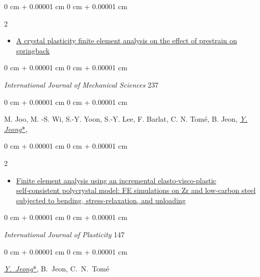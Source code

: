 \documentclass[10pt, letterpaper]{article}
\newenvironment{highlights}{
    \begin{itemize}[
        topsep=0.10 cm,
        parsep=0.10 cm,
        partopsep=0pt,
        itemsep=0pt,
        leftmargin=0 cm + 10pt
    ]
}{
    \end{itemize}
} %
\newenvironment{onecolentry}{
    \begin{adjustwidth}{
        0 cm + 0.00001 cm
    }{
        0 cm + 0.00001 cm
    }
}{
    \end{adjustwidth}
} %
\newenvironment{twocolentry}[2][]{
    \onecolentry
    \def\secondColumn{#2}
    \setcolumnwidth{\fill, 4.5 cm}
    \begin{paracol}{2}
}{
    \switchcolumn \raggedleft \secondColumn
    \end{paracol}
    \endonecolentry
} %
\begin{document}
\begin{samepage}
            \begin{twocolentry}{2023}
                \begin{highlights}
                \item\href{https://doi.org/10.1016/j.ijmecsci.2022.107796}{A crystal plasticity finite element analysis on the effect of prestrain on springback}
                \end{highlights}
            \end{twocolentry}
            \begin{onecolentry}
                {\it International Journal of Mechanical Sciences} 237
              \end{onecolentry}
            \begin{onecolentry}
                M. Joo, M. -S. Wi, S.-Y. Yoon, S.-Y. Lee, F. Barlat, C. N. Tomé, B. Jeon, {\underline{\textit{Y. Jeong}*}},
             \end{onecolentry}
            \vspace{0.10 cm}

            \begin{twocolentry}{2021}
                \begin{highlights}
                \item\href{https://doi.org/10.1016/j.ijplas.2021.103110}{Finite element analysis using an incremental elasto‑visco‑plastic self‑consistent polycrystal model: FE simulations on Zr and low‑carbon steel subjected to bending, stress‑relaxation, and unloading}
                \end{highlights}
            \end{twocolentry}
            \begin{onecolentry}
                {\it International Journal of Plasticity} 147
            \end{onecolentry}
            \begin{onecolentry}
                \mbox{\underline{\textit{Y. Jeong}*}}, \mbox{B. Jeon}, \mbox{C. N. Tomé}
            \end{onecolentry}
            \vspace{0.10 cm}



\end{samepage}
\end{document}
